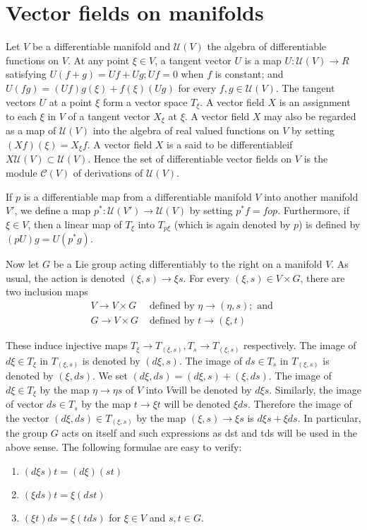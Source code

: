 \section{Vector fields on manifolds}\label{chap2:sec7}

Let $V$ be a differentiable manifold and $\mathscr{U} (V)$ the
algebra of differentiable functions on $V$. At any point $\xi \in V$,
a tangent vector $U$ is a map $U : \mathscr{U} (V) \to R$ satisfying
$U (f + g ) = Uf + Ug; U f = 0 $ when $f $ is constant; and $U (fg)  =
(Uf) g (\xi) + f (\xi)  (Ug) $ for every $f, g \in \mathscr{U}
(V)$. The tangent vectors $U$ at a point $\xi$ form a vector space
$T_{ \xi}$. A vector field $X$ is an assignment to each $\xi$ in $V$
of a tangent vector $X _\xi$ at $\xi$. A vector field $X$ may also be
regarded as a map of $\mathscr{U} (V)$ into the algebra of real valued
functions on $V$ by setting $(Xf)(\xi) = X_\xi f$. A vector field $X$
is a said to be differentiable\pageoriginale if $X \mathscr{U}(V)\subset \mathscr{U}
(V)$. Hence the set of differentiable vector fields on $V$ is the
module $\mathscr{C}(V)$ of derivations of $\mathscr{U}(V)$.  

If $p$ is a differentiable map from a differentiable manifold $V$ into
another manifold $V'$, we define a map $p^* : \mathscr{U} (V') \to
\mathscr{U}(V)$ by setting $p^*  f = fop $. Furthermore, if $\xi \in
V$, then a linear map of $T_\xi$ into $T_{ p \xi }$ (which is again
denoted by $p$) is defined by $(pU) g = U(p^* g)$.  

Now let $G$ be a Lie group acting differentiably to the right on a
manifold $V$. As usual, the action is denoted $(\xi , s ) \to \xi
s$. For every $(\xi , s ) \in  V \times G$, there are two inclusion
maps  
\begin{align*}
  V \to V \times G & \text{ defined by } \eta \to (\eta , s ); \text{ and }\\
  G \to V \times G & \text{ defined by } t  \to (\xi , t )
\end{align*}

These induce injective maps $T_\xi \to T_{ ( \xi , s)}, T_s \to T_{
  (\xi, s)}$ respectively. The image of $d \xi \in T_\xi$ in $T_{ (
  \xi, s)}$ is denoted by $(d \xi , s )$. The image of $ds  \in T_s$
in $T_{(\xi, s)}$ is denoted by $(\xi , ds)$. We set $(d \xi, ds ) =
(d \xi, s) + (\xi, ds )$. The image of $d \xi \in T_\xi$ by the map
$\eta \to \eta s $ of $V$ into $V$will be denoted by $d \xi
s$. Similarly, the image of  vector $ds \in T_s$ by the map $t \to \xi
t $ will be denoted $\xi  ds$. Therefore the image of the vector $(d
\xi ,  ds) \in T_{(\xi , s )}$ by the map $(\xi, s )\to \xi s $ is $d
\xi s + \xi ds$. In particular, the group $G$ acts on itself and such
expressions as dst and tds will be used in the above sense. The
following formulae are easy to verify:  
\begin{enumerate}[1)]
\item $(d \xi s ) t = (d \xi ) (st)$\pageoriginale 
\item $( \xi ds ) t =  \xi  (dst)$
\item $(\xi t ) ds =  \xi  (tds)$ for $\xi \in V$ and $s, t \in G$. 
\end{enumerate}

